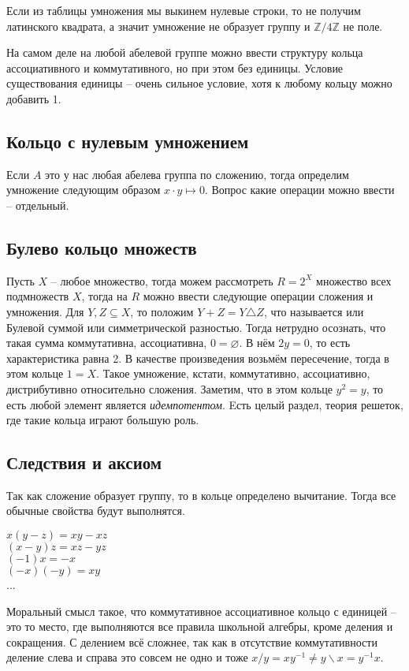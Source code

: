 Если из таблицы умножения мы выкинем нулевые строки, то не получим латинского
квадрата, а значит умножение не образует группу и $\mathbb{Z}/4\mathbb{Z}$ не
поле.

На самом деле на любой абелевой группе можно ввести структуру кольца
ассоциативного и коммутативного, но при этом без единицы. Условие существования
единицы – очень сильное условие, хотя к любому кольцу можно добавить 1.

\subsection{Кольцо с нулевым умножением}
Если $A$ это у нас любая абелева группа по сложению, тогда определим умножение
следующим образом $x\cdot y\mapsto 0$. Вопрос какие операции можно ввести –
отдельный.

\subsection{Булево кольцо множеств}
Пусть $X$ – любое множество, тогда можем рассмотреть $R=2^X$ множество всех
подмножеств $X$, тогда на $R$ можно ввести следующие операции сложения и
умножения. Для $Y,Z\subseteq X$, то положим $Y+Z=Y\triangle Z$, что называется
или Булевой суммой или симметрической разностью. Тогда нетрудно осознать, что
такая сумма коммутативна, ассоциативна, $0=\varnothing$. В нём $2y=0$, то есть
характеристика равна 2. В качестве произведения возьмём пересечение, тогда в
этом кольце $1=X$. Такое умножение, кстати, коммутативно, ассоциативно,
дистрибутивно относительно сложения. Заметим, что в этом кольце $y^2=y$, то
есть любой элемент является \emph{идемпотентом}. Eсть целый раздел, теория
решеток, где такие кольца играют большую роль.

\subsection{Следствия и аксиом}
Так как сложение образует группу, то в кольце определено вычитание. Тогда все
обычные свойства будут выполнятся.
\begin{center}
    $x(y-z) = xy-xz$\\
    $(x-y)z = xz-yz$\\
    $(-1)x = -x$\\
    $(-x)(-y) = xy$\\
    ...
\end{center}
Моральный смысл такое, что коммутативное ассоциативное кольцо с единицей – это
то место, где выполняются все правила школьной алгебры, кроме деления и
сокращения. С делением всё сложнее, так как в отсутствие коммутативности деление
слева и справа это совсем не одно и тоже $x/y=xy^{-1}\neq y\backslash x=y^{-1}x$.

